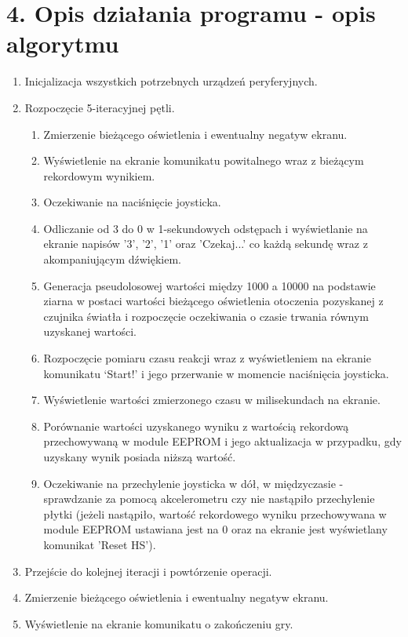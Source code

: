 \documentclass[a4paper,12pt]{report}
\begin{document}
\section*{4. Opis działania programu - opis algorytmu}
\begin{enumerate}
    \item Inicjalizacja wszystkich potrzebnych urządzeń peryferyjnych.
    \item Rozpoczęcie 5-iteracyjnej pętli.
          \begin{enumerate}
              \item Zmierzenie bieżącego oświetlenia i ewentualny negatyw ekranu.
              \item Wyświetlenie na ekranie komunikatu powitalnego wraz z bieżącym rekordowym wynikiem.
              \item Oczekiwanie na naciśnięcie joysticka.
              \item Odliczanie od 3 do 0 w 1-sekundowych odstępach i wyświetlanie na ekranie napisów '3', '2', '1' oraz 'Czekaj...' co każdą sekundę wraz z akompaniującym dźwiękiem.
              \item Generacja pseudolosowej wartości między 1000 a 10000 na podstawie ziarna w postaci wartości bieżącego oświetlenia otoczenia pozyskanej z czujnika światła i rozpoczęcie oczekiwania o czasie trwania równym uzyskanej wartości.
              \item Rozpoczęcie pomiaru czasu reakcji wraz z wyświetleniem na ekranie komunikatu ‘Start!’ i jego przerwanie w momencie naciśnięcia joysticka.
              \item Wyświetlenie wartości zmierzonego czasu w milisekundach na ekranie.
              \item Porównanie wartości uzyskanego wyniku z wartością rekordową przechowywaną w module EEPROM i jego aktualizacja w przypadku, gdy uzyskany wynik posiada niższą wartość.
              \item Oczekiwanie na przechylenie joysticka w dół, w międzyczasie - sprawdzanie za pomocą akcelerometru czy nie nastąpiło przechylenie płytki (jeżeli nastąpiło, wartość rekordowego wyniku przechowywana w module EEPROM ustawiana jest na 0 oraz na ekranie jest wyświetlany komunikat 'Reset HS').
          \end{enumerate}
    \item Przejście do kolejnej iteracji i powtórzenie operacji.
    \item Zmierzenie bieżącego oświetlenia i ewentualny negatyw ekranu.
    \item Wyświetlenie na ekranie komunikatu o zakończeniu gry.
\end{enumerate}
\end{document}

